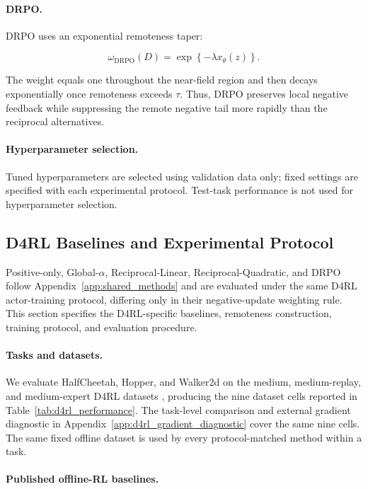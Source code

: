 \documentclass{article}
\theoremstyle{plain}
\theoremstyle{definition}
\theoremstyle{remark}
\begin{document}
\paragraph{DRPO.}

DRPO uses an exponential remoteness taper:

\[
\omega_{\mathrm{DRPO}}(D)
=
\exp\left\{
-\lambda x_\theta(z)
\right\}.
\]

The weight equals one throughout the near-field region and then decays
exponentially once remoteness exceeds \(\tau\). Thus, DRPO preserves
local negative feedback while suppressing the remote negative tail more
rapidly than the reciprocal alternatives.

\paragraph{Hyperparameter selection.}

Tuned hyperparameters are selected using validation data only; fixed settings
are specified with each experimental protocol. Test-task performance is not
used for hyperparameter selection.


\subsection{D4RL Baselines and Experimental Protocol}
\label{app:d4rl_methods}

Positive-only, Global-\(\alpha\), Reciprocal-Linear,
Reciprocal-Quadratic, and DRPO follow Appendix~\ref{app:shared_methods}
and are evaluated under the same D4RL actor-training protocol, differing
only in their negative-update weighting rule. This section specifies the
D4RL-specific baselines, remoteness construction, training protocol, and
evaluation procedure.

\paragraph{Tasks and datasets.}

We evaluate HalfCheetah, Hopper, and Walker2d on the medium,
medium-replay, and medium-expert D4RL datasets
\citep{fu2020d4rl}, producing the nine dataset cells reported in
Table~\ref{tab:d4rl_performance}. The task-level comparison and external
gradient diagnostic in Appendix~\ref{app:d4rl_gradient_diagnostic} cover the
same nine cells. The same fixed offline dataset is used by every
protocol-matched method within a task.

\paragraph{Published offline-RL baselines.}
\end{document}
